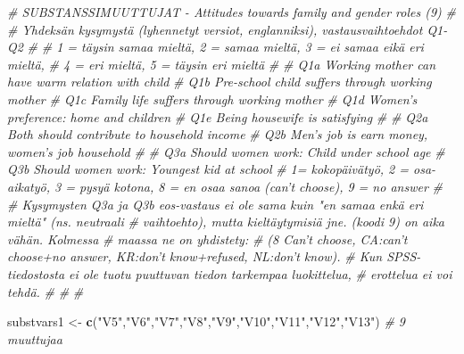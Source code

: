 \documentclass[
  finnish,
]{book}
\newenvironment{Shaded}{\begin{snugshade}}{\end{snugshade}}
\newcommand{\CommentTok}[1]{\textcolor[rgb]{0.56,0.35,0.01}{\textit{#1}}}
\newcommand{\KeywordTok}[1]{\textcolor[rgb]{0.13,0.29,0.53}{\textbf{#1}}}
\newcommand{\NormalTok}[1]{#1}
\newcommand{\StringTok}[1]{\textcolor[rgb]{0.31,0.60,0.02}{#1}}
\begin{document}
\begin{Shaded}
\begin{Highlighting}[]
{\CommentTok{# SUBSTANSSIMUUTTUJAT - Attitudes towards family and gender roles (9)}
\CommentTok{#}
\CommentTok{# Yhdeksän kysymystä (lyhennetyt versiot, englanniksi), vastausvaihtoehdot Q1-Q2}
\CommentTok{#}
\CommentTok{# 1 = täysin samaa mieltä, 2 = samaa mieltä, 3 = ei samaa eikä eri mieltä, }
\CommentTok{# 4 = eri mieltä, 5 = täysin eri mieltä}
\CommentTok{# }
\CommentTok{# Q1a Working mother can have warm relation with child}
\CommentTok{# Q1b Pre-school child suffers through working mother}
\CommentTok{# Q1c Family life suffers through working mother}
\CommentTok{# Q1d Women’s preference: home and children}
\CommentTok{# Q1e Being housewife is satisfying}
\CommentTok{#}
\CommentTok{# Q2a Both should contribute to household income}
\CommentTok{# Q2b Men’s job is earn money, women’s job household}
\CommentTok{#}
\CommentTok{# Q3a Should women work: Child under school age }
\CommentTok{# Q3b Should women work: Youngest kid at school}
\CommentTok{# 1= kokopäivätyö, 2 = osa-aikatyö, 3 = pysyä kotona, 8 = en osaa sanoa (can't choose), 9 = no answer}
\CommentTok{#}
\CommentTok{# Kysymysten Q3a ja Q3b eos-vastaus ei ole sama kuin "en samaa enkä eri  mieltä" (ns. neutraali }
\CommentTok{# vaihtoehto), mutta kieltäytymisiä jne. (koodi 9) on aika vähän. Kolmessa }
\CommentTok{# maassa ne on yhdistety: }
\CommentTok{# (8 Can't choose, CA:can't choose+no answer, KR:don't know+refused, NL:don't know).}
\CommentTok{# Kun SPSS-tiedostosta ei ole tuotu puuttuvan tiedon tarkempaa luokittelua,}
\CommentTok{# erottelua ei voi tehdä.}
\CommentTok{#}
\CommentTok{# }
\CommentTok{#}

\NormalTok{substvars1 <-}\StringTok{ }\KeywordTok{c}\NormalTok{(}\StringTok{"V5"}\NormalTok{,}\StringTok{"V6"}\NormalTok{,}\StringTok{"V7"}\NormalTok{,}\StringTok{"V8"}\NormalTok{,}\StringTok{"V9"}\NormalTok{,}\StringTok{"V10"}\NormalTok{,}\StringTok{"V11"}\NormalTok{,}\StringTok{"V12"}\NormalTok{,}\StringTok{"V13"}\NormalTok{) }\CommentTok{# 9 muuttujaa}

}
\end{Highlighting}
\end{Shaded}
\end{document}
